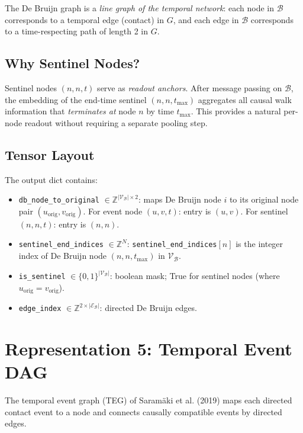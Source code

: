 \documentclass[12pt,a4paper]{report}
\newcommand{\calV}{\mathcal{V}}
\newcommand{\calE}{\mathcal{E}}
\newcommand{\calB}{\mathcal{B}}
\begin{document}
The De Bruijn graph is a \emph{line graph of the temporal network}: each node in
$\calB$ corresponds to a temporal edge (contact) in $G$, and each edge in $\calB$
corresponds to a time-respecting path of length 2 in $G$.

\subsection{Why Sentinel Nodes?}

Sentinel nodes $(n,n,t)$ serve as \emph{readout anchors}. After message passing
on $\calB$, the embedding of the end-time sentinel $(n,n,t_{\max})$ aggregates
all causal walk information that \emph{terminates at} node $n$ by time
$t_{\max}$. This provides a natural per-node readout without requiring a
separate pooling step.

\subsection{Tensor Layout}

The output dict contains:
\begin{itemize}[noitemsep]
  \item \texttt{db\_node\_to\_original} $\in \mathbb{Z}^{|\calV_\calB| \times 2}$:
    maps De Bruijn node $i$ to its original node pair $(u_{\text{orig}},
    v_{\text{orig}})$. For event node $(u,v,t)$: entry is $(u,v)$. For sentinel
    $(n,n,t)$: entry is $(n,n)$.
  \item \texttt{sentinel\_end\_indices} $\in \mathbb{Z}^N$:
    \texttt{sentinel\_end\_indices}$[n]$ is the integer index of De Bruijn node
    $(n,n,t_{\max})$ in $\calV_\calB$.
  \item \texttt{is\_sentinel} $\in \{0,1\}^{|\calV_\calB|}$: boolean mask; True
    for sentinel nodes (where $u_{\text{orig}} = v_{\text{orig}}$).
  \item \texttt{edge\_index} $\in \mathbb{Z}^{2 \times |\calE_\calB|}$: directed
    De Bruijn edges.
\end{itemize}

\section{Representation 5: Temporal Event DAG}
\label{sec:dag_rep}

The temporal event graph (TEG) of Saramäki et al. (2019) maps each directed
contact event to a node and connects causally compatible events by directed edges.
\end{document}
